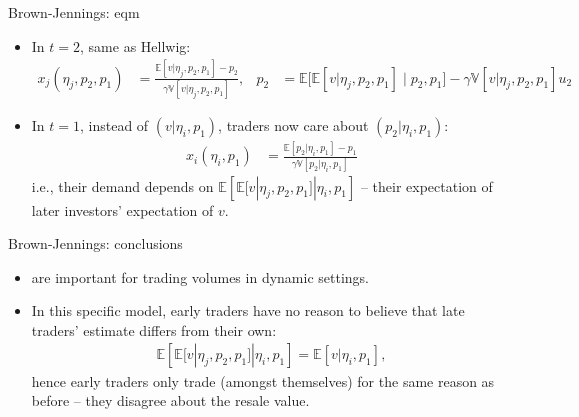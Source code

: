 \documentclass[english,10pt
,aspectratio=169
]{beamer}
\begin{document}
\begin{frame}{Brown-Jennings: eqm}
	\begin{itemize}
		\item \alert<1>{In $t=2$}, same as Hellwig: 
		\begin{align*}
			x_j(\eta_j,p_2,p_1) &= \frac{\mathbb{E} \left[ v | \eta_j, p_2, p_1\right] - p_2}{\gamma \mathbb{V} \left[ v| \eta_j, p_2, p_1\right]},
			& 
			p_2 &= \mathbb{E} \Big[ \mathbb{E} [v|\eta_j, p_2, p_1] \mid p_2, p_1 \Big] - \gamma \mathbb{V} \left[ v| \eta_j, p_2, p_1\right] u_2
		\end{align*}
		\pause
		\item \alert{In $t=1$}, instead of $(v|\eta_i, p_1)$, traders now care about $(p_2|\eta_i, p_1)$:
		\begin{align*}
			x_i(\eta_i,p_1) &= \frac{\mathbb{E} \left[ p_2|\eta_i, p_1\right] - p_1}{\gamma \mathbb{V} \left[ p_2|\eta_i, p_1\right]}
		\end{align*}
		i.e., their \alert{demand depends on} $\mathbb{E} \left[ \mathbb{E} [v|\eta_j, p_2, p_1] | \eta_i, p_1\right]$ -- their expectation of later investors' expectation of $v$.
	\end{itemize}
\end{frame}


\begin{frame}{Brown-Jennings: conclusions}
	\begin{itemize}
		\item {} are important for trading volumes in dynamic settings.
		\item In this specific model, early traders have no reason to believe that late traders' estimate differs from their own:
		\begin{align*}
			\mathbb{E} \left[ \mathbb{E} [v|\eta_j, p_2, p_1] | \eta_i, p_1\right] = \mathbb{E} \left[ v | \eta_i, p_1\right],
		\end{align*}
		hence early traders only trade (amongst themselves) for the same reason as before -- they \alert{disagree about the resale value}.
	\end{itemize}
\end{frame}
\end{document}
